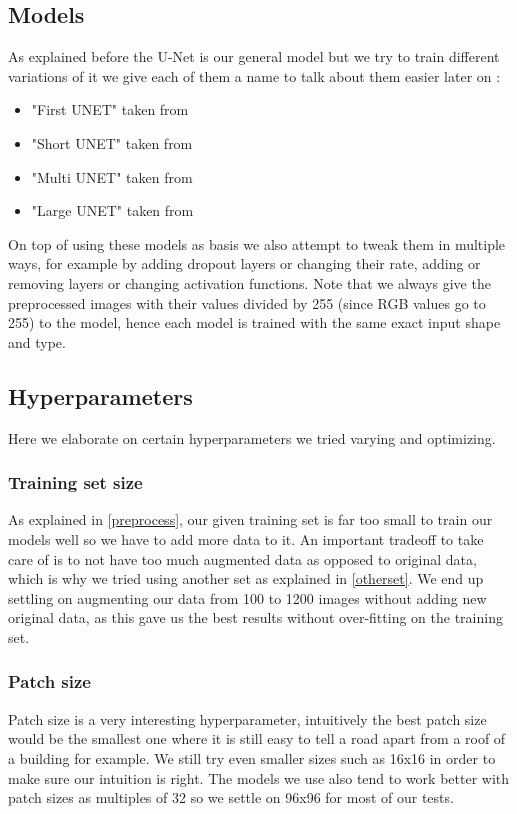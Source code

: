 \documentclass[10pt,conference,compsocconf]{IEEEtran}
\begin{document}
\subsection{Models}
As explained before the U-Net is our general model but we try to train different variations of it we give each of them a name to talk about them easier later on :
\begin{itemize}
\item "First UNET" taken from \cite{first-unet}
\item "Short UNET" taken from \cite{short-unet}
\item "Multi UNET" taken from \cite{multi-unet}
\item "Large UNET" taken from \cite{large-unet}
\end{itemize}
On top of using these models as basis we also attempt to tweak them in multiple ways, for example by adding dropout layers or changing their rate, adding or removing layers or changing activation functions.
Note that we always give the preprocessed images with their values divided by 255 (since RGB values go to 255) to the model, hence each model is trained with the same exact input shape and type.

\subsection{Hyperparameters}
Here we elaborate on certain hyperparameters we tried varying and optimizing.
\subsubsection{Training set size}
As explained in \ref{preprocess}, our given training set is far too small to train our models well so we have to add more data to it. An important tradeoff to take care of is to not have too much augmented data as opposed to original data, which is why we tried using another set as explained in \ref{otherset}. We end up settling on augmenting our data from 100 to 1200 images without adding new original data, as this gave us the best results without over-fitting on the training set.
\subsubsection{Patch size}
Patch size is a very interesting hyperparameter, intuitively the best patch size would be the smallest one where it is still easy to tell a road apart from a roof of a building for example. We still try even smaller sizes such as 16x16 in order to make sure our intuition is right. The models we use also tend to work better with patch sizes as multiples of 32 so we settle on 96x96 for most of our tests.
\end{document}
